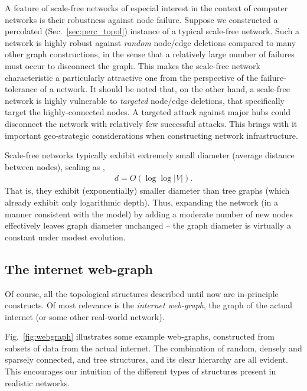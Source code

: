 A feature of scale-free networks of especial interest in the context of computer networks is their robustness against node failure. Suppose we constructed a percolated (Sec.~\ref{sec:perc_topol}) instance of a typical scale-free network. Such a network is highly robust against \textit{random} node/edge deletions compared to many other graph constructions, in the sense that a relatively large number of failures must occur to disconnect the graph. This makes the scale-free network characteristic a particularly attractive one from the perspective of the failure-tolerance of a network. It should be noted that, on the other hand, a scale-free network is highly vulnerable to \textit{targeted} node/edge deletions, that specifically target the highly-connected nodes. A targeted attack against major hubs could disconnect the network with relatively few successful attacks. This brings with it important geo-strategic considerations when constructing network infrastructure.

Scale-free networks typically exhibit extremely small diameter (average distance between nodes), scaling as \cite{bib:PhysRevLett.90.058701},
\begin{align}
	d = O(\log \log |V|).
\end{align}
That is, they exhibit (exponentially) smaller diameter than tree graphs (which already exhibit only logarithmic depth). Thus, expanding the network (in a manner consistent with the model) by adding a moderate number of new nodes effectively leaves graph diameter unchanged -- the graph diameter is virtually a constant under modest evolution.

%
%

\subsection{The internet web-graph} 

Of course, all the topological structures described until now are in-principle constructs. Of most relevance is the \textit{internet web-graph}, the graph of the actual internet (or some other real-world network).

Fig.~\ref{fig:webgraph} illustrates some example web-graphs, constructed from subsets of data from the actual internet. The combination of random, densely and sparsely connected, and tree structures, and its clear hierarchy are all evident. This encourages our intuition of the different types of structures present in realistic networks.

